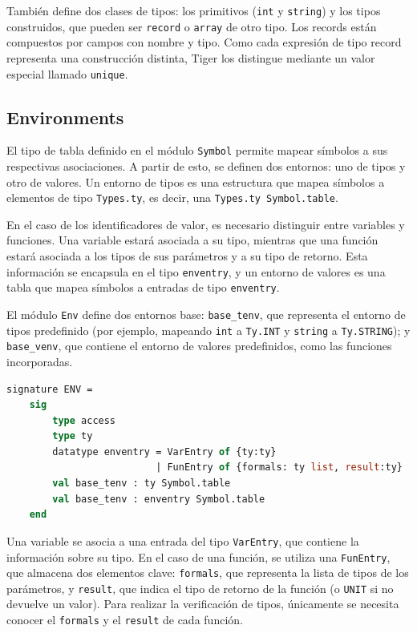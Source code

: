 \documentclass[runningheads]{llncs}
\begin{document}
También define dos clases de tipos: los primitivos (\texttt{int} y \texttt{string}) y los tipos construidos, que pueden ser \texttt{record} o \texttt{array} de otro tipo. Los records están compuestos por campos con nombre y tipo. Como cada expresión de tipo record representa una construcción distinta, Tiger los distingue mediante un valor especial llamado \texttt{unique}.

\subsection{Environments}
El tipo de tabla definido en el módulo \texttt{Symbol} permite mapear símbolos a sus respectivas asociaciones. A partir de esto, se definen dos entornos: uno de tipos y otro de valores. Un entorno de tipos es una estructura que mapea símbolos a elementos de tipo \texttt{Types.ty}, es decir, una \texttt{Types.ty Symbol.table}.

En el caso de los identificadores de valor, es necesario distinguir entre variables y funciones. Una variable estará asociada a su tipo, mientras que una función estará asociada a los tipos de sus parámetros y a su tipo de retorno. Esta información se encapsula en el tipo \texttt{enventry}, y un entorno de valores es una tabla que mapea símbolos a entradas de tipo \texttt{enventry}.

El módulo \texttt{Env} define dos entornos base: \texttt{base\_tenv}, que representa el entorno de tipos predefinido (por ejemplo, mapeando \texttt{int} a \texttt{Ty.INT} y \texttt{string} a \texttt{Ty.STRING}); y \texttt{base\_venv}, que contiene el entorno de valores predefinidos, como las funciones incorporadas.

\begin{lstlisting}[language=ML, caption={Firma del módulo ENV}, captionpos=b]
    signature ENV = 
    sig 
        type access 
        type ty
        datatype enventry = VarEntry of {ty:ty}
                          | FunEntry of {formals: ty list, result:ty}
        val base_tenv : ty Symbol.table 
        val base_tenv : enventry Symbol.table
    end
\end{lstlisting}
Una variable se asocia a una entrada del tipo \texttt{VarEntry}, que contiene la información sobre su tipo. En el caso de una función, se utiliza una \texttt{FunEntry}, que almacena dos elementos clave: \texttt{formals}, que representa la lista de tipos de los parámetros, y \texttt{result}, que indica el tipo de retorno de la función (o \texttt{UNIT} si no devuelve un valor). Para realizar la verificación de tipos, únicamente se necesita conocer el \texttt{formals} y el \texttt{result} de cada función.
\end{document}
